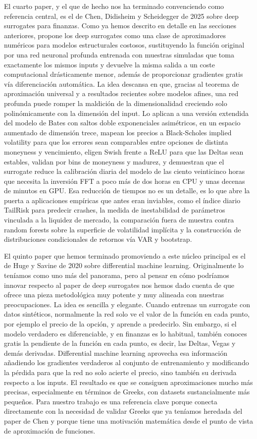 \documentclass[11pt,a4paper]{article}
\begin{document}
El cuarto paper, y el que de hecho nos ha terminado convenciendo como referencia central, es el de Chen, Didisheim y Scheidegger de 2025 sobre deep surrogates para finanzas. Como ya hemos descrito en detalle en las secciones anteriores, propone los deep surrogates como una clase de aproximadores numéricos para modelos estructurales costosos, sustituyendo la función original por una red neuronal profunda entrenada con muestras simuladas que toma exactamente los mismos inputs y devuelve la misma salida a un coste computacional drásticamente menor, además de proporcionar gradientes gratis vía diferenciación automática. La idea descansa en que, gracias al teorema de aproximación universal y a resultados recientes sobre modelos afines, una red profunda puede romper la maldición de la dimensionalidad creciendo solo polinómicamente con la dimensión del input. Lo aplican a una versión extendida del modelo de Bates con saltos doble exponenciales asimétricos, en un espacio aumentado de dimensión trece, mapean los precios a Black-Scholes implied volatility para que los errores sean comparables entre opciones de distinta moneyness y vencimiento, eligen Swish frente a ReLU para que las Deltas sean estables, validan por bins de moneyness y madurez, y demuestran que el surrogate reduce la calibración diaria del modelo de las ciento veinticinco horas que necesita la inversión FFT a poco más de dos horas en CPU y unas decenas de minutos en GPU. Esa reducción de tiempos no es un detalle, es lo que abre la puerta a aplicaciones empíricas que antes eran inviables, como el índice diario TailRisk para predecir crashes, la medida de inestabilidad de parámetros vinculada a la liquidez de mercado, la comparación fuera de muestra contra random forests sobre la superficie de volatilidad implícita y la construcción de distribuciones condicionales de retornos vía VAR y bootstrap.

El quinto paper que hemos terminado promoviendo a este núcleo principal es el de Huge y Savine de 2020 sobre differential machine learning. Originalmente lo teníamos como uno más del panorama, pero al pensar en cómo podríamos innovar respecto al paper de deep surrogates nos hemos dado cuenta de que ofrece una pieza metodológica muy potente y muy alineada con nuestras preocupaciones. La idea es sencilla y elegante. Cuando entrenas un surrogate con datos sintéticos, normalmente la red solo ve el valor de la función en cada punto, por ejemplo el precio de la opción, y aprende a predecirlo. Sin embargo, si el modelo verdadero es diferenciable, y en finanzas es lo habitual, también conoces gratis la pendiente de la función en cada punto, es decir, las Deltas, Vegas y demás derivadas. Differential machine learning aprovecha esa información añadiendo los gradientes verdaderos al conjunto de entrenamiento y modificando la pérdida para que la red no solo acierte el precio, sino también su derivada respecto a los inputs. El resultado es que se consiguen aproximaciones mucho más precisas, especialmente en términos de Greeks, con datasets sustancialmente más pequeños. Para nuestro trabajo es una referencia clave porque conecta directamente con la necesidad de validar Greeks que ya teníamos heredada del paper de Chen y porque tiene una motivación matemática desde el punto de vista de aproximación de funciones.
\end{document}
